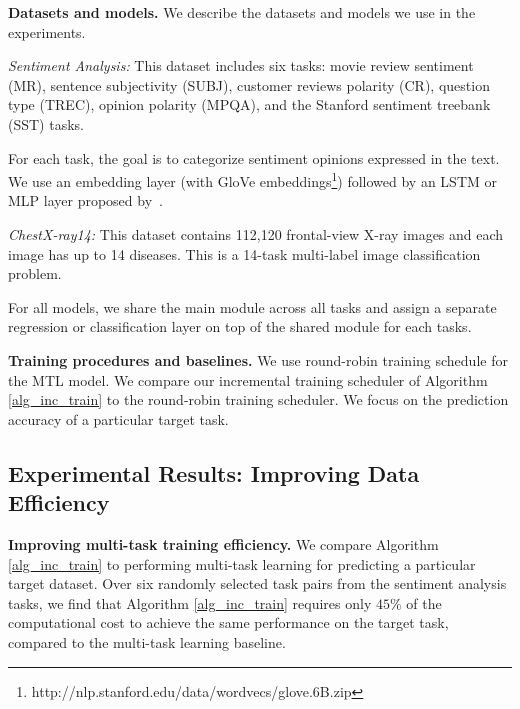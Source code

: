 {\bf Datasets and models.} We describe the datasets and models we use in the experiments.

{\it Sentiment Analysis:} This dataset includes six tasks: movie review sentiment (MR), sentence subjectivity (SUBJ), customer reviews polarity (CR), question type (TREC), opinion polarity (MPQA), and the Stanford sentiment treebank (SST) tasks.

{For each task, the goal is to categorize sentiment opinions expressed in the text.
We use an embedding layer (with GloVe embeddings\footnote{http://nlp.stanford.edu/data/wordvecs/glove.6B.zip}) followed by an LSTM or MLP layer proposed by~\cite{lei2018simple}.
}

{\it ChestX-ray14:} This dataset contains 112,120 frontal-view X-ray images and each image has up to 14 diseases.
This is a 14-task multi-label image classification problem.

For all models, we share the main module across all tasks and assign a separate regression or classification layer on top of the shared module for each tasks.

\textbf{Training procedures and baselines.} We use round-robin training schedule for the MTL model.
We compare our incremental training scheduler of Algorithm \ref{alg_inc_train} to the round-robin training scheduler.
We focus on the prediction accuracy of a particular target task.


\subsection{Experimental Results: Improving Data Efficiency}

\textbf{Improving multi-task training efficiency.}
We compare Algorithm \ref{alg_inc_train} to performing multi-task learning for predicting a particular target dataset.
Over six randomly selected task pairs from the sentiment analysis tasks, we find that Algorithm \ref{alg_inc_train} requires only $45\%$ of the computational cost to achieve the same performance on the target task, compared to the multi-task learning baseline.

